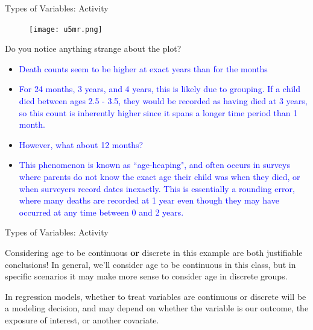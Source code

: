 \documentclass[10pt,t]{beamer}
\begin{document}
\begin{frame}{Types of Variables: Activity}

\vspace{-8 mm}

\begin{figure}
	\centering \texttt{[image: u5mr.png]}
\end{figure}
	
{\small Do you notice anything strange about the plot? }
	
\smallskip
	
\begin{itemize}
	\item \small \textcolor{blue} {Death counts seem to be higher at exact years than for the months}
	\smallskip
		
	\item \small \textcolor{blue} {For 24 months, 3 years, and 4 years, this is likely due to grouping. If a child died between ages 2.5 - 3.5, they would be recorded as having died at 3 years, so this count is inherently higher since it spans a longer time period than 1 month.} 
	\smallskip
	
    \item \small \textcolor{blue} {However, what about 12 months?}
	\smallskip

	\item \small \textcolor{blue}{This phenomenon is known as ``age-heaping", and often occurs in surveys where parents do not know the exact age their child was when they died, or when surveyers record dates inexactly. This is essentially a rounding error, where many deaths are recorded at 1 year even though they may have occurred at any time between 0 and 2 years. }
\end{itemize}	
	
\end{frame}

\begin{frame}{Types of Variables: Activity}


Considering age to be continuous \textbf{or} discrete in this example are both justifiable conclusions! In general, we'll consider age to be continuous in this class, but in specific scenarios it may make more sense to consider age in discrete groups. 
\bigskip

In regression models, whether to treat variables are continuous or discrete will be a modeling decision, and may depend on whether the variable is our outcome, the exposure of interest, or another covariate.

\end{frame}
\end{document}
